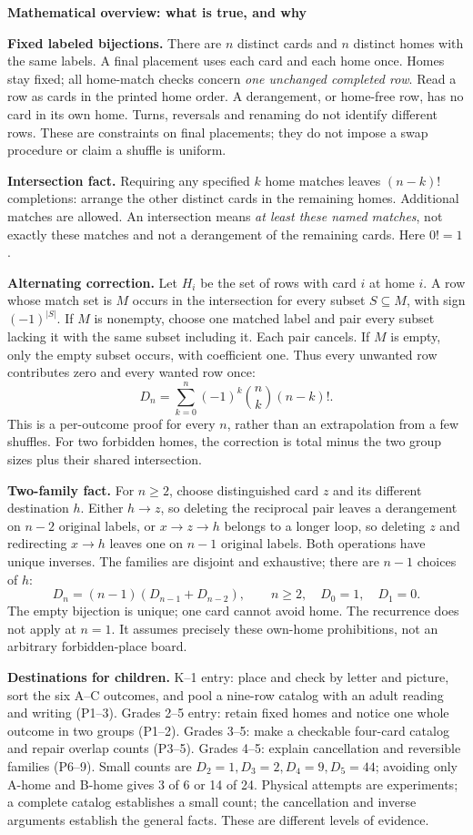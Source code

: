 \documentclass[11pt]{article}
\newcommand{\heading}[1]{\par\textbf{\large #1}\par}
\begin{document}
\heading{Mathematical overview: what is true, and why}

\textbf{Fixed labeled bijections.} There are $n$ distinct cards and $n$ distinct homes with the same labels. A final placement uses each card and each home once. Homes stay fixed; all home-match checks concern \emph{one unchanged completed row}. Read a row as cards in the printed home order. A derangement, or home-free row, has no card in its own home. Turns, reversals and renaming do not identify different rows. These are constraints on final placements; they do not impose a swap procedure or claim a shuffle is uniform.

\textbf{Intersection fact.} Requiring any specified $k$ home matches leaves $(n-k)!$ completions: arrange the other distinct cards in the remaining homes. Additional matches are allowed. An intersection means \emph{at least these named matches}, not exactly these matches and not a derangement of the remaining cards. Here $0!=1$.

\textbf{Alternating correction.} Let $H_i$ be the set of rows with card $i$ at home $i$. A row whose match set is $M$ occurs in the intersection for every subset $S\subseteq M$, with sign $(-1)^{|S|}$. If $M$ is nonempty, choose one matched label and pair every subset lacking it with the same subset including it. Each pair cancels. If $M$ is empty, only the empty subset occurs, with coefficient one. Thus every unwanted row contributes zero and every wanted row once:
\[
 D_n=\sum_{k=0}^{n}(-1)^k\binom nk(n-k)!.
\]
This is a per-outcome proof for every $n$, rather than an extrapolation from a few shuffles. For two forbidden homes, the correction is total minus the two group sizes plus their shared intersection.

\textbf{Two-family fact.} For $n\geq2$, choose distinguished card $z$ and its different destination $h$. Either $h\to z$, so deleting the reciprocal pair leaves a derangement on $n-2$ original labels, or $x\to z\to h$ belongs to a longer loop, so deleting $z$ and redirecting $x\to h$ leaves one on $n-1$ original labels. Both operations have unique inverses. The families are disjoint and exhaustive; there are $n-1$ choices of $h$:
\[
 D_n=(n-1)(D_{n-1}+D_{n-2}),\qquad n\geq2,\quad D_0=1,\quad D_1=0.
\]
The empty bijection is unique; one card cannot avoid home. The recurrence does not apply at $n=1$. It assumes precisely these own-home prohibitions, not an arbitrary forbidden-place board.

\textbf{Destinations for children.} K--1 entry: place and check by letter and picture, sort the six A--C outcomes, and pool a nine-row catalog with an adult reading and writing (P1--3). Grades 2--5 entry: retain fixed homes and notice one whole outcome in two groups (P1--2). Grades 3--5: make a checkable four-card catalog and repair overlap counts (P3--5). Grades 4--5: explain cancellation and reversible families (P6--9). Small counts are $D_2=1,D_3=2,D_4=9,D_5=44$; avoiding only A-home and B-home gives 3 of 6 or 14 of 24. Physical attempts are experiments; a complete catalog establishes a small count; the cancellation and inverse arguments establish the general facts. These are different levels of evidence.
\end{document}
